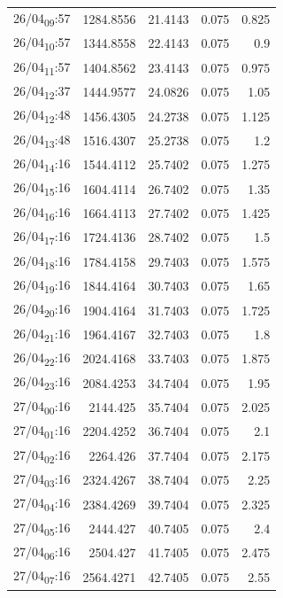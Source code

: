\documentclass[11pt]{article}
\begin{document}
\begin{table}[htbp]
\begin{tabular}{lrrrr}
26/04\textsubscript{09}:57 & 1284.8556 & 21.4143 & 0.075 & 0.825\\[0pt]
26/04\textsubscript{10}:57 & 1344.8558 & 22.4143 & 0.075 & 0.9\\[0pt]
26/04\textsubscript{11}:57 & 1404.8562 & 23.4143 & 0.075 & 0.975\\[0pt]
26/04\textsubscript{12}:37 & 1444.9577 & 24.0826 & 0.075 & 1.05\\[0pt]
26/04\textsubscript{12}:48 & 1456.4305 & 24.2738 & 0.075 & 1.125\\[0pt]
26/04\textsubscript{13}:48 & 1516.4307 & 25.2738 & 0.075 & 1.2\\[0pt]
26/04\textsubscript{14}:16 & 1544.4112 & 25.7402 & 0.075 & 1.275\\[0pt]
26/04\textsubscript{15}:16 & 1604.4114 & 26.7402 & 0.075 & 1.35\\[0pt]
26/04\textsubscript{16}:16 & 1664.4113 & 27.7402 & 0.075 & 1.425\\[0pt]
26/04\textsubscript{17}:16 & 1724.4136 & 28.7402 & 0.075 & 1.5\\[0pt]
26/04\textsubscript{18}:16 & 1784.4158 & 29.7403 & 0.075 & 1.575\\[0pt]
26/04\textsubscript{19}:16 & 1844.4164 & 30.7403 & 0.075 & 1.65\\[0pt]
26/04\textsubscript{20}:16 & 1904.4164 & 31.7403 & 0.075 & 1.725\\[0pt]
26/04\textsubscript{21}:16 & 1964.4167 & 32.7403 & 0.075 & 1.8\\[0pt]
26/04\textsubscript{22}:16 & 2024.4168 & 33.7403 & 0.075 & 1.875\\[0pt]
26/04\textsubscript{23}:16 & 2084.4253 & 34.7404 & 0.075 & 1.95\\[0pt]
27/04\textsubscript{00}:16 & 2144.425 & 35.7404 & 0.075 & 2.025\\[0pt]
27/04\textsubscript{01}:16 & 2204.4252 & 36.7404 & 0.075 & 2.1\\[0pt]
27/04\textsubscript{02}:16 & 2264.426 & 37.7404 & 0.075 & 2.175\\[0pt]
27/04\textsubscript{03}:16 & 2324.4267 & 38.7404 & 0.075 & 2.25\\[0pt]
27/04\textsubscript{04}:16 & 2384.4269 & 39.7404 & 0.075 & 2.325\\[0pt]
27/04\textsubscript{05}:16 & 2444.427 & 40.7405 & 0.075 & 2.4\\[0pt]
27/04\textsubscript{06}:16 & 2504.427 & 41.7405 & 0.075 & 2.475\\[0pt]
27/04\textsubscript{07}:16 & 2564.4271 & 42.7405 & 0.075 & 2.55\\[0pt]

\end{tabular}
\end{table}
\end{document}

